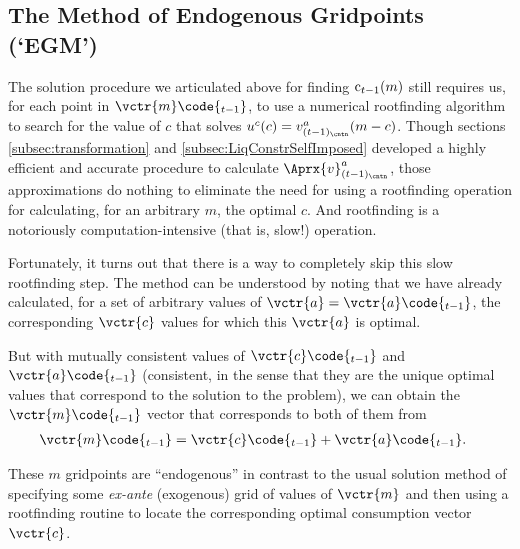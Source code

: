 \documentclass[titlepage, headings=optiontotocandhead]{Resources/texmf-local/tex/latex/econtex}
\begin{document}
\hypertarget{the-method-of-endogenous-gridpoints}{}
\subsection{The Method of Endogenous Gridpoints (`EGM')}\label{subsec:egm}

The solution procedure we articulated above for finding $\mathrm{c}_{t-1}(m)$ still requires us, for each point in $\vctr{m}\code{_{t-1}}$, to use a numerical rootfinding algorithm to search for the value of $c$ that solves $u^{c}(c) = v^{a}_{(t-1)_\cntn}(m-c)$.  Though sections \ref{subsec:transformation} and \ref{subsec:LiqConstrSelfImposed} developed a highly efficient and accurate procedure to calculate $\Aprx{v}^{a}_{(t-1)_\cntn}$, those approximations do nothing to eliminate the need for using a rootfinding operation for calculating, for an arbitrary $m$, the optimal $c$.  And rootfinding is a notoriously computation-intensive (that is, slow!) operation.

Fortunately, it turns out that there is a way to completely skip this slow rootfinding step.  The method can be understood by noting that we have already calculated, for a set of arbitrary values of $\vctr{a}=\vctr{a}\code{_{t-1}}$, the corresponding $\vctr{c}$ values for which this $\vctr{a}$ is optimal.


But with mutually consistent values of $\vctr{c}\code{_{t-1}}$ and $\vctr{a}\code{_{t-1}}$ (consistent, in the sense that they are the unique optimal values that correspond to the solution to the problem), we can obtain the $\vctr{m}\code{_{t-1}}$ vector that corresponds to both of them from
\begin{equation}\begin{gathered}\begin{aligned}
      \vctr{m}\code{_{t-1}}  & = {\vctr{c}\code{_{t-1}}+\vctr{a}\code{_{t-1}}}.
    \end{aligned}\end{gathered}\end{equation}


These $m$ gridpoints are ``endogenous'' in contrast to the usual solution method of specifying some \textit{ex-ante} (exogenous) grid of values of $\vctr{m}$ and then using a rootfinding routine to locate the corresponding optimal consumption vector $\vctr{c}$.
\end{document}
